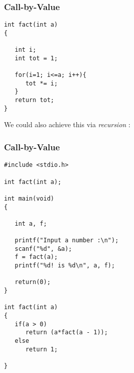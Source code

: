 \begin{frame}[fragile]
\frametitle{Call-by-Value}
\begin{verbatim}
int fact(int a)
{

   int i;
   int tot = 1;

   for(i=1; i<=a; i++){
      tot *= i;
   }
   return tot;
}
\end{verbatim}

We could also achieve this via {\it recursion} :
\end{frame}

\begin{frame}[fragile]
\frametitle{Call-by-Value}
\begin{verbatim}
#include <stdio.h>

int fact(int a);

int main(void)
{

   int a, f;

   printf("Input a number :\n");
   scanf("%d", &a);
   f = fact(a);
   printf("%d! is %d\n", a, f);

   return(0);
}

int fact(int a)
{
   if(a > 0)
      return (a*fact(a - 1));
   else
      return 1;

}
\end{verbatim}
\end{frame}

